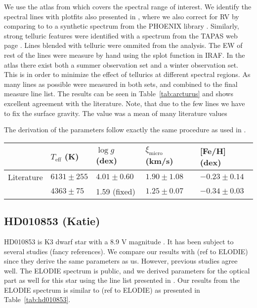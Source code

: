 \documentclass{aa}
\begin{document}
We use the atlas from \cite{Hinkle2003} which covers the spectral range of
interest. We identify the spectral lines with plot\textunderscore{}fits also
presented in \cite{Andreasen2016}, where we also correct for RV by comparing to
to a synthetic spectrum from the PHOENIX library \citep{Husser2013}. Similarly,
strong telluric features were identified with a spectrum from the TAPAS web page
\citep{Bertaux2014}. Lines blended with telluric were ommited from the analysis.
The EW of rest of the lines were measure by hand using the splot function in
IRAF. In the atlas there exist both a summer observation set and a winter
observation set. This is in order to minimize the effect of tellurics at
different spectral regions. As many lines as possible were measured in both
sets, and combined to the final measure line list. The results can be seen in
Table~\ref{tab:arcturus} and shows excellent agreement with the literature.
Note, that due to the few  lines we have to fix the surface gravity.
The value was a mean of many literature values

The derivation of the parameters follow exactly the same procedure as used
in \cite{Andreasen2016}.

\begin{table*}[htb!]
    \caption{The derived parameters for Arcturus with
    fixed surface gravity cut after 3$\sigma$ outlier removal. linelist: arcturus2Cut4ol.moog}
    \label{tab:arcturus}
    \centering
    \begin{tabular}{lllll}
      \hline\hline
                     & $T_\mathrm{eff}$ (K) &  $\log g$ (dex)  &   $\xi_\mathrm{micro}$ (km/s)   & [Fe/H] (dex)      \\
      \hline
        Literature   & $6131 \pm 255$       &  $4.01 \pm 0.60$ &    $1.90 \pm 1.08$              & $-0.23 \pm 0.14$ \\
      \hline
                     & $4363 \pm 75$        &   1.59 (fixed)   &    $1.25 \pm 0.07$              & $-0.34 \pm 0.03$ \\
      \hline
    \end{tabular}
\end{table*}



\subsection{HD010853 (Katie)}
\label{sub:HD010853}
HD010853 is K3 dwarf star with a 8.9 V magnitude \citep{Koen2010}. It has been
subject to several studies (fancy references). We compare our results with (ref
to ELODIE) since they derive the same parameters as us. However, previous
studies agree well. The ELODIE spectrum is public, and we derived parameters for
the optical part as well for this star using the line list presented in
\citet{Sousa2008a}. Our results from the ELODIE spectrum is similar to (ref to
ELODIE) as presented in Table~\ref{tab:hd010853}.
\end{document}
